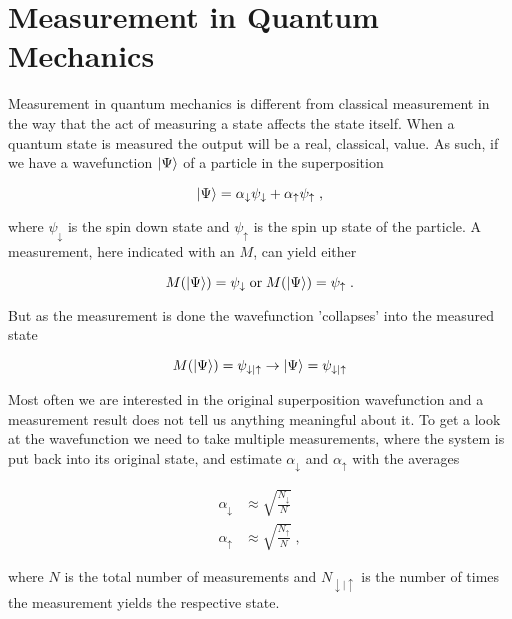 \section{Measurement in Quantum Mechanics}

Measurement in quantum mechanics is different from classical measurement in the way that the act of measuring a state affects the state itself. When a quantum state is measured the output will be a real, classical, value. As such, if we have a wavefunction $\ket{\Psi}$ of a particle in the superposition

\begin{equation}
  \ket{\Psi} = \alpha_{\downarrow}\psi_{\downarrow} + \alpha_{\uparrow}\psi_{\uparrow} \; ,
  \label{eq:measurement_superposition}
\end{equation}

where $\psi_{\downarrow}$ is the spin down state and $\psi_{\uparrow}$ is the spin up state of the particle. A measurement, here indicated with an $M$, can yield either

$$M(\ket{\Psi}) = \psi_{\downarrow} \; \text{or} \; M({\ket{\Psi}}) = \psi_{\uparrow} \; .$$

But as the measurement is done the wavefunction 'collapses' into the measured state

$$M(\ket{\Psi}) = \psi_{\downarrow|\uparrow}\rightarrow\ket{\Psi} = \psi_{\downarrow|\uparrow}$$

Most often we are interested in the original superposition wavefunction and a measurement result does not tell us anything meaningful about it. To get a look at the wavefunction we need to take multiple measurements, where the system is put back into its original state, and estimate $\alpha_{\downarrow}$ and $\alpha_{\uparrow}$ with the averages

\begin{align}
  \alpha_{\downarrow}&\approx \sqrt{\frac{N_{\downarrow}}{N}} \\
  \alpha_{\uparrow}&\approx\sqrt{\frac{N_{\uparrow}}{N}} \; ,
\end{align}

where $N$ is the total number of measurements and $N_{\downarrow|\uparrow}$ is the number of times the measurement yields the respective state.
